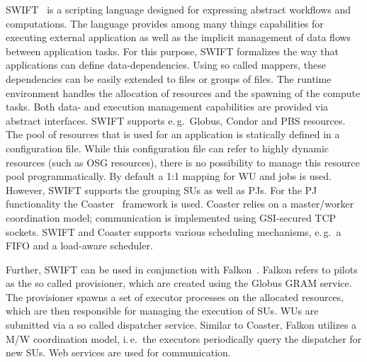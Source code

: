 \documentclass[conference,final]{IEEEtran}
\newcommand{\jhanote}[1]{ {\textcolor{red} { ***shantenu: #1 }}}
\newcommand{\alnote}[1]{ {\textcolor{blue} { ***andre: #1 }}}
\newcommand{\alnote}[1]{}
\newcommand{\jhanote}[1]{}
\begin{document}
SWIFT~\cite{Wilde2011} is a scripting language designed for expressing abstract
workflows and computations. The language provides among many things capabilities
for executing external application as well as the implicit management of data
flows between application tasks. For this purpose, SWIFT formalizes the way that
applications can define data-dependencies. Using so called mappers, these
dependencies can be easily extended to files or groups of files. The runtime
environment handles the allocation of resources and the spawning of the compute
tasks. Both data- and execution management capabilities are provided via
abstract interfaces. SWIFT supports e.\,g.\ Globus, Condor and PBS resources.
The pool of resources that is used for an application is statically defined in a
configuration file. While this configuration file can refer to highly dynamic
resources (such as OSG resources), there is no possibility to manage this
resource pool programmatically. By default a 1:1 mapping for WU and jobs is
used. However, SWIFT supports the grouping SUs as well as PJs. For the PJ
functionality the Coaster~\cite{coasters} framework is used. Coaster relies on a
master/worker coordination model; communication is implemented using GSI-secured
TCP sockets. SWIFT and Coaster supports various scheduling mechanisms, e.\,g.\ 
a FIFO and a load-aware scheduler. 

Further, SWIFT can be used in conjunction with Falkon~\cite{1362680}. Falkon
refers to pilots as the so called provisioner, which are created using the
Globus GRAM service. The provisioner spawns a set of executor processes on the
allocated resources, which are then responsible for managing the execution of
SUs. WUs are submitted via a so called dispatcher service. Similar to Coaster,
Falkon utilizes a M/W coordination model, i.\,e.\ the executors periodically
query the dispatcher for new SUs. Web services are used for communication.






\end{document}
